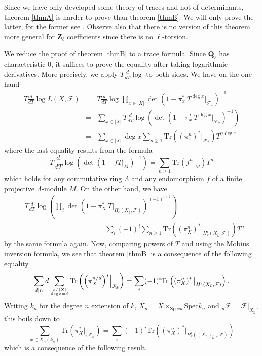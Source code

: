 \begin{remark}
Since we have only developed some theory of traces and not of determinants, 
theorem \ref{thmA} is harder to prove than theorem \ref{thmB}. We will only 
prove the latter, for the former see \cite{SGA4.5}. Observe also that there is 
no version of this theorem more general for $\mathbf{Z}_\ell$ coefficients 
since there is no $\ell$-torsion.
\end{remark}

We reduce the proof of theorem \ref{thmB} to a trace formula. Since 
$\mathbf{Q}_\ell$ has characteristic 0, it suffices to prove the equality after 
taking logarithmic derivatives. More precisely, we apply $T\frac{d}{dT} \log $ 
to both sides. We have on the one hand
\begin{eqnarray*}
T\frac{d}{dT}\log L(X, \mathcal{F}) & = & 
T\frac{d}{dT} \log \prod_{x\in |X|} \det\left(1-\pi_x^*\ T^{\deg 
x}\Big|_{\mathcal{F}_{\bar x}}\right)^{-1}\\
& = & \sum_{x\in |X|} T\frac{d}{dT} \log \left( \det\left(1-\pi_x^*\ T^{\deg 
x}\Big|_{\mathcal{F}_{\bar x}}\right)^{-1}\right) \\
&= & \sum_{x \in |X|} \deg x\sum_{n \geq 1} 
\text{Tr}\left({\left(\pi_x^n\right)}^*\big|_{\mathcal{F}_{\bar x}}\right) 
T^{n\deg x}
\end{eqnarray*}
where the last equality results from the formula
$$
T\frac{d}{dT}\log\left(\det\left(1-fT|_M\right)^{-1}\right) = \sum_{n\geq 1} 
\text{Tr}(f^n|_M)T^n
$$
which holds for any commutative ring $\Lambda$ and any endomorphism $f$ of a 
finite projective $\Lambda$-module $M$. On the other hand, we have
\begin{align*}
&T\frac{d}{dT} \log\left(\prod_i \det\left(1-\pi_X^*\ 
T\Big|_{H_c^i\left(X_{\bar k} , \mathcal{F}\right)}\right)^{(-1)^{i+1}}\right) 
\\
&\qquad\qquad\qquad \qquad = \qquad
\sum_i (-1)^i \sum_{n\geq 1} 
\text{Tr}\left({\left(\pi_X^n\right)}^*\big|_{H_c^i(X_{\bar k}, 
\mathcal{F})}\right) T^n
\end{align*}
by the same formula again. Now, comparing powers of $T$ and using the Mobius 
inversion formula, we see that theorem \ref{thmB} is a consequence of the 
following equality
$$
\sum_{d | n} d \sum_{x\in |X| \atop \deg x = d} \text{Tr} \left( {\left( 
\pi_X^{n/d} \right)}^* \Big|_{\mathcal{F}_{\bar x}} \right)
=
\sum_i (-1)^i \text{Tr}\left(\left(\pi^n_X\right)^*\big|_{H^i_c(X_{\bar k}, 
\mathcal{F})} \right).
$$
Writing $k_n$ for the degree $n$ extension of $k$, $X_n = X \times_{\text{Spec} 
k} \text{Spec} k_n$ and $_n \mathcal{F} = \mathcal{F}|_{X_n}$, this boils down 
to
$$
\sum_{x \in X_n(k_n)} \text{Tr}\left( \pi_X^*\big|_{_n\mathcal{F}_{\bar x}} 
\right)
=
\sum_i (-1)^i \text{Tr}\left(\left(\pi^n_X\right)^*\big|_{H^i_c({(X_n)}_{\bar 
k}, _n\mathcal{F})} \right)
$$
which is a consequence of the following result.

